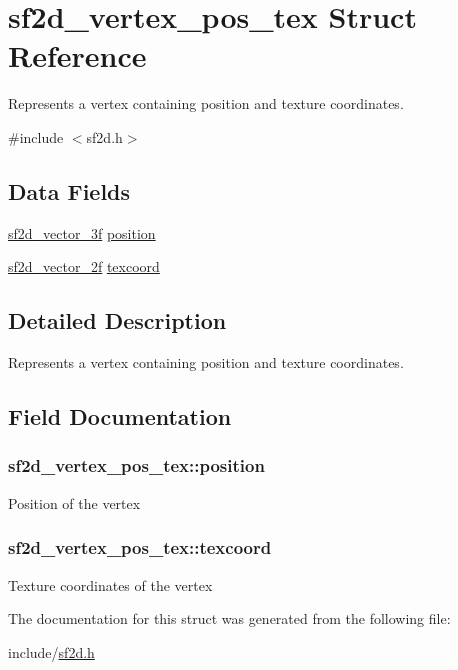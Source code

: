 \hypertarget{structsf2d__vertex__pos__tex}{\section{sf2d\-\_\-vertex\-\_\-pos\-\_\-tex Struct Reference}
\label{structsf2d__vertex__pos__tex}
}


Represents a vertex containing position and texture coordinates.  




{\ttfamily \#include $<$sf2d.\-h$>$}

\subsection*{Data Fields}
\begin{DoxyCompactItemize}
\item 
\hyperlink{structsf2d__vector__3f}{sf2d\-\_\-vector\-\_\-3f} \hyperlink{structsf2d__vertex__pos__tex_ae5e85779f0eb3db4b2c26fe77be8cf41}{position}
\item 
\hyperlink{structsf2d__vector__2f}{sf2d\-\_\-vector\-\_\-2f} \hyperlink{structsf2d__vertex__pos__tex_a72fcf7753d1977b813b6e5336c27fce6}{texcoord}
\end{DoxyCompactItemize}


\subsection{Detailed Description}
Represents a vertex containing position and texture coordinates. 

\subsection{Field Documentation}
\hypertarget{structsf2d__vertex__pos__tex_ae5e85779f0eb3db4b2c26fe77be8cf41}{
\subsubsection[{position}]{ sf2d\-\_\-vertex\-\_\-pos\-\_\-tex\-::position}}\label{structsf2d__vertex__pos__tex_ae5e85779f0eb3db4b2c26fe77be8cf41}
Position of the vertex \hypertarget{structsf2d__vertex__pos__tex_a72fcf7753d1977b813b6e5336c27fce6}{
\subsubsection[{texcoord}]{ sf2d\-\_\-vertex\-\_\-pos\-\_\-tex\-::texcoord}}\label{structsf2d__vertex__pos__tex_a72fcf7753d1977b813b6e5336c27fce6}
Texture coordinates of the vertex 

The documentation for this struct was generated from the following file\-:\begin{DoxyCompactItemize}
\item 
include/\hyperlink{sf2d_8h}{sf2d.\-h}\end{DoxyCompactItemize}

